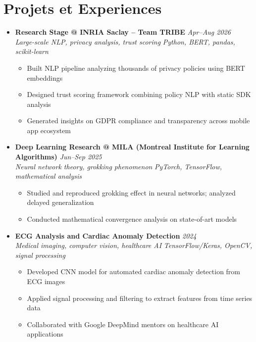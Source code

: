 \documentclass[a4paper,11pt]{article}
\begin{document}
\section{Projets et Experiences}
\begin{itemize}[leftmargin=*, label={-}]

\item \textbf{Research Stage @ INRIA Saclay -- Team TRIBE} \hfill \textit{Apr--Aug 2026} \\
\textit{Large-scale NLP, privacy analysis, trust scoring} \hfill \textit{Python, BERT, pandas, scikit-learn}
\vspace{-2pt}
    \begin{itemize}[leftmargin=0.4cm, nosep, label=\tiny$\bullet$]
        \item \small{Built NLP pipeline analyzing thousands of privacy policies using BERT embeddings}
        \item \small{Designed trust scoring framework combining policy NLP with static SDK analysis}
        \item \small{Generated insights on GDPR compliance and transparency across mobile app ecosystem}
    \end{itemize}
\vspace{3pt}

\item \textbf{Deep Learning Research @ MILA (Montreal Institute for Learning Algorithms)} \hfill \textit{Jun--Sep 2025} \\
\textit{Neural network theory, grokking phenomenon} \hfill \textit{PyTorch, TensorFlow, mathematical analysis}
\vspace{-2pt}
    \begin{itemize}[leftmargin=0.4cm, nosep, label=\tiny$\bullet$]
        \item \small{Studied and reproduced grokking effect in neural networks; analyzed delayed generalization}
        \item \small{Conducted mathematical convergence analysis on state-of-art models}
    \end{itemize}
\vspace{3pt}

\item \textbf{ECG Analysis and Cardiac Anomaly Detection} \hfill \textit{2024} \\
\textit{Medical imaging, computer vision, healthcare AI} \hfill \textit{TensorFlow/Keras, OpenCV, signal processing}
\vspace{-2pt}
    \begin{itemize}[leftmargin=0.4cm, nosep, label=\tiny$\bullet$]
        \item \small{Developed CNN model for automated cardiac anomaly detection from ECG images}
        \item \small{Applied signal processing and filtering to extract features from time series data}
        \item \small{Collaborated with Google DeepMind mentors on healthcare AI applications}
    \end{itemize}
\vspace{3pt}


\end{itemize}
\end{document}
